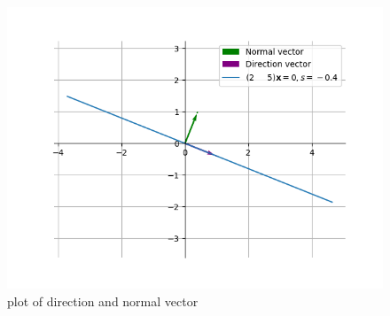 \documentclass[journal]{IEEEtran}
\begin{document}
 \begin{figure}[h!]
  \centering
  \includegraphics[width=1\linewidth]{fig/fig.png}
  \caption{plot of direction and normal vector}
 \end{figure}
\end{document}

